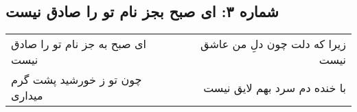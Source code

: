 \begin{center}
\section*{شماره ۳: ای صبح بجز نام تو را صادق نیست}
\label{sec:003}
\begin{longtable}{l p{0.5cm} r}
ای صبح به جز نام تو را صادق نیست
&&
زیرا که دلت چون دلِ من عاشق نیست
\\
چون تو ز خورشید پشت گرم میداری
&&
با خنده دم سرد بهم لایق نیست
\\
\end{longtable}
\end{center}
